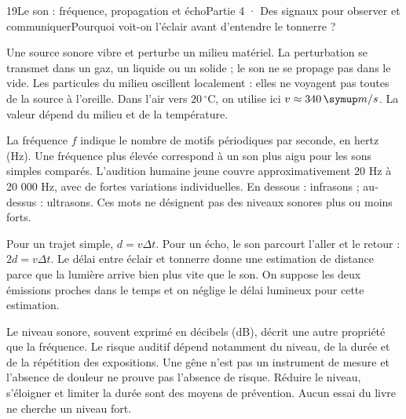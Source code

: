 \begin{ouverture}[college4]{19}{Le son : fréquence, propagation et écho}{Partie 4 · Des signaux pour observer et communiquer}{Pourquoi voit-on l’éclair avant d’entendre le tonnerre ?}
\end{ouverture}
\label{ess-19}
Une source sonore vibre et perturbe un milieu matériel. La perturbation se transmet dans un gaz, un liquide ou un solide ; le son ne se propage pas dans le vide. Les particules du milieu oscillent localement : elles ne voyagent pas toutes de la source à l’oreille. Dans l’air vers $20\,^{\circ}\mathrm C$, on utilise ici $v\approx340\unite{m/s}$. La valeur dépend du milieu et de la température.\par
{}
La fréquence $f$ indique le nombre de motifs périodiques par seconde, en hertz (Hz). Une fréquence plus élevée correspond à un son plus aigu pour les sons simples comparés. L’audition humaine jeune couvre approximativement 20 Hz à 20 000 Hz, avec de fortes variations individuelles. En dessous : infrasons ; au-dessus : ultrasons. Ces mots ne désignent pas des niveaux sonores plus ou moins forts.\par
\clearpage
{}
Pour un trajet simple, $d=v\Delta t$. Pour un écho, le son parcourt l’aller et le retour : $2d=v\Delta t$. Le délai entre éclair et tonnerre donne une estimation de distance parce que la lumière arrive bien plus vite que le son. On suppose les deux émissions proches dans le temps et on néglige le délai lumineux pour cette estimation.\par
{}
Le niveau sonore, souvent exprimé en décibels (dB), décrit une autre propriété que la fréquence. Le risque auditif dépend notamment du niveau, de la durée et de la répétition des expositions. Une gêne n’est pas un instrument de mesure et l’absence de douleur ne prouve pas l’absence de risque. Réduire le niveau, s’éloigner et limiter la durée sont des moyens de prévention. Aucun essai du livre ne cherche un niveau fort.\par
